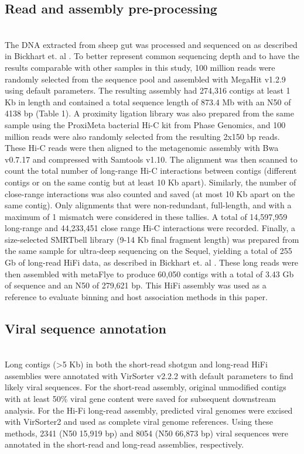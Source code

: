 \subsection*{Read and assembly pre-processing} \hfill\\
	The DNA extracted from sheep gut was processed and sequenced on as described in Bickhart et. al \cite{RN15}. To better represent common sequencing depth and to have the results comparable with other samples in this study, 100 million reads were randomly selected from the sequence pool and assembled with MegaHit \cite{RN26} v1.2.9 using default parameters. The resulting assembly had 274,316 contigs at least 1 Kb in length and contained a total sequence length of 873.4 Mb with an N50 of 4138 bp (Table 1). A proximity ligation library was also prepared from the same sample using the ProxiMeta bacterial Hi-C kit from Phase Genomics, and 100 million reads were also randomly selected from the resulting 2x150 bp reads. These Hi-C reads were then aligned to the metagenomic assembly with Bwa \cite{RN65} v0.7.17 and compressed with Samtools \cite{RN22} v1.10. The alignment was then scanned to count the total number of long-range Hi-C interactions between contigs (different contigs or on the same contig but at least 10 Kb apart). Similarly, the number of close-range interactions was also counted and saved (at most 10 Kb apart on the same contig). Only alignments that were non-redundant, full-length, and with a maximum of 1 mismatch were considered in these tallies. A total of 14,597,959 long-range and 44,233,451 close range Hi-C interactions were recorded. Finally, a size-selected SMRTbell \cite{RN70} library (9-14 Kb final fragment length) was prepared from the same sample for ultra-deep sequencing on the Sequel, yielding a total of 255 Gb of long-read HiFi data, as described in Bickhart et. al \cite{RN15}. These long reads were then assembled with metaFlye \cite{RN71} to produce 60,050 contigs with a total of 3.43 Gb of sequence and an N50 of 279,621 bp. This HiFi assembly was used as a reference to evaluate binning and host association methods in this paper. 


\subsection*{Viral sequence annotation} \hfill\\
	Long contigs (>5 Kb) in both the short-read shotgun and long-read HiFi assemblies were annotated with VirSorter \cite{RN24} v2.2.2 with default parameters to find likely viral sequences. For the short-read assembly, original unmodified contigs with at least 50\% viral gene content were saved for subsequent downstream analysis. For the Hi-Fi long-read assembly, predicted viral genomes were excised with VirSorter2 and used as complete viral genome references. Using these methods, 2341 (N50 15,919 bp) and 8054 (N50 66,873 bp) viral sequences were annotated in the short-read and long-read assemblies, respectively. 
	

